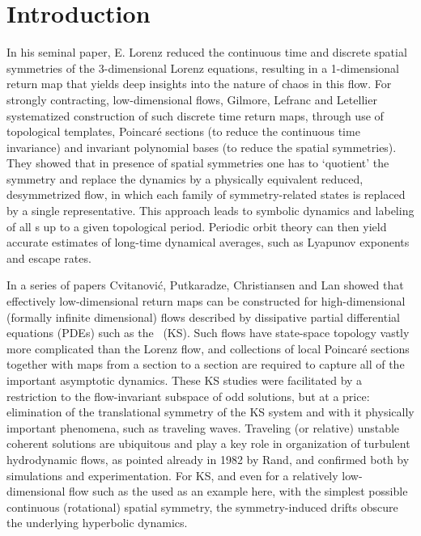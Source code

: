 \documentclass[preprint,number,sort&compress]{elsarticle}
\begin{document}
\section{\label{s:intro} Introduction}

In his seminal paper, E. Lorenz reduced the
continuous time and discrete spatial symmetries of the
3-dimensional Lorenz equations, resulting in a 1-dimensional
return map that yields deep insights into the
nature of chaos in this flow. For strongly contracting,
low-dimensional flows, Gilmore, Lefranc and
Letellier systematized construction
of such discrete time return maps, through use of topological
templates, Poincar\'e sections (to reduce the continuous time
invariance) and invariant polynomial bases (to reduce the
spatial symmetries). They showed that in presence of spatial
symmetries one has to  `quotient' the symmetry and replace
the dynamics by a physically equivalent reduced,
desymmetrized flow, in which each family of symmetry-related
states is replaced by a single representative. This approach
leads to symbolic dynamics and labeling of all \po s up to a
given topological period. Periodic orbit theory can then
yield accurate estimates of long-time dynamical averages,
such as Lyapunov exponents and escape rates.

In a series of papers Cvitanovi\'{c}, Putkaradze,
Christiansen and Lan%
showed that effectively low-dimensional return maps can be
constructed for high-dimensional (formally infinite
dimensional)  flows described by dissipative partial
differential equations (PDEs) such as the \KSe\ (KS). Such
flows have state-space topology vastly more complicated than
the Lorenz flow, and collections of local Poincar\'e sections
together with maps from a section to a section are required
to capture all of the important asymptotic dynamics. These KS
studies were facilitated by a restriction to the
flow-invariant subspace of odd solutions, but at a price:
elimination of the translational symmetry of the KS system
and with it physically important phenomena, such as traveling
waves. Traveling (or relative) unstable coherent solutions
are ubiquitous and play a key role in organization of
turbulent hydrodynamic flows, as pointed already in
1982 by Rand, and confirmed both by
simulations and
experimentation.
For KS, and even for a relatively
low-dimensional flow such as the
\cLe{} used as an example here, with
the simplest possible continuous (rotational) spatial
symmetry, the symmetry-induced drifts obscure the underlying
hyperbolic dynamics.
\end{document}
